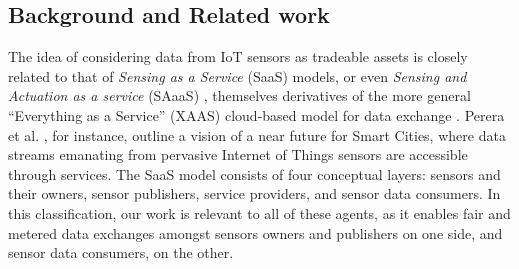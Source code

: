 \documentclass[chi_draft]{sigchi}
\begin{document}


\subsection{Background and Related work}




The idea of considering data from IoT sensors as tradeable assets is closely related to that of \textit{Sensing as a Service} (SaaS) models, or even \textit{Sensing and Actuation as a service} (SAaaS) \cite{distefano2012sensing}, themselves derivatives of the more general ``Everything as a Service'' (XAAS) cloud-based model for data exchange \cite{5719575}. Perera et al. \cite{Perera2014}, for instance, outline a vision of a near future for Smart Cities, where data streams emanating from pervasive Internet of Things sensors are accessible through services. The SaaS model consists of four conceptual layers: sensors and their owners, sensor publishers, service providers, and sensor data consumers. In this classification, our work is relevant to all of these agents, as it enables fair and metered data exchanges amongst sensors owners and publishers on one side, and sensor data consumers, on the other.


\end{document}
